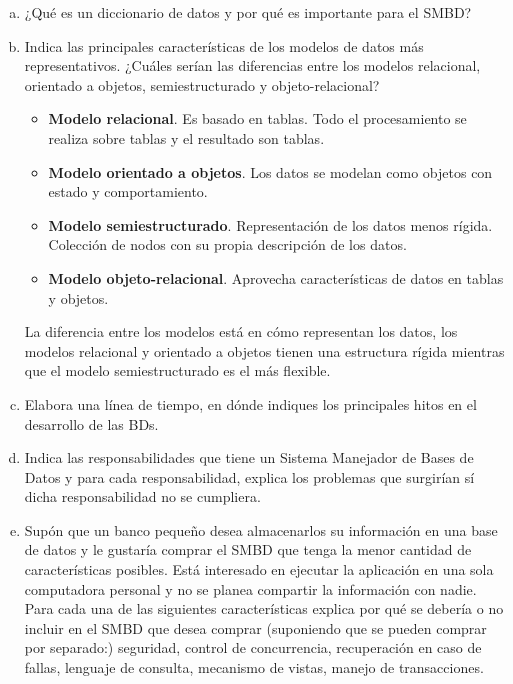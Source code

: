 \documentclass[letterpaper,11pt]{article}
\begin{document}
\begin{enumerate}
\begin{enumerate}[a. ]
        \item ¿Qué es un diccionario de datos y por qué es importante para el SMBD?

        \item Indica las principales características de los modelos de datos más representativos. ¿Cuáles serían las diferencias entre los modelos relacional, orientado a objetos, semiestructurado y objeto-relacional?\\

	\begin{itemize}
		
		\item \textbf{Modelo relacional}. Es basado en tablas. Todo el procesamiento se realiza sobre tablas y el resultado son tablas.
		\item \textbf{Modelo orientado a objetos}. Los datos se modelan como objetos con estado y comportamiento.

		\item \textbf{Modelo semiestructurado}. Representación de los datos menos rígida. Colección de nodos con su propia descripción de los datos.

		\item \textbf{Modelo objeto-relacional}. Aprovecha características de datos en tablas y objetos. 

	\end{itemize}

	La diferencia entre los modelos está en cómo representan los datos, los modelos relacional y orientado a objetos tienen una estructura rígida mientras que el modelo semiestructurado es el más flexible.\\

        \item Elabora una línea de tiempo, en dónde indiques los principales hitos en el desarrollo de las BDs.

        \item Indica las responsabilidades que tiene un Sistema Manejador de Bases de Datos y para cada responsabilidad, explica los problemas que surgirían sí dicha responsabilidad no se cumpliera.

        \item Supón que un banco pequeño desea almacenarlos su información en una base de datos y le gustaría comprar el SMBD que tenga la menor cantidad de características posibles. Está interesado en ejecutar la aplicación en una sola computadora personal y no se planea compartir la información con nadie. Para cada una de las siguientes características explica por qué se debería o no incluir en el SMBD que desea comprar (suponiendo que se pueden comprar por separado:) seguridad, control de concurrencia, recuperación en caso de fallas, lenguaje de consulta, mecanismo de vistas, manejo de transacciones.


\end{enumerate}
\end{enumerate}
\end{document}
